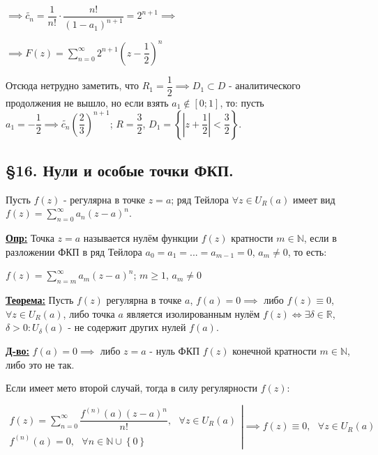 \documentclass[a4paper, 12pt]{article}
\begin{document}
 \begin{center}
   $\implies \tilde{c_n} = \dfrac{1}{n!} \cdot \dfrac{n!}{(1 - a_1)^{n+1}} = 2^{n+1} \implies$

   $\implies F(z) = \displaystyle\sum\limits_{n=0}^{\infty} 2^{n+1} \left( z - \dfrac{1}{2} \right)^n$
 \end{center}

 \quad Отсюда нетрудно заметить, что $R_1 = \dfrac{1}{2} \implies D_1 \subset D$ - аналитического продолжения не вышло, но если взять $a_1 \notin [0; 1]$, то: пусть $a_1 = -\dfrac{1}{2} \implies \tilde{c_n} \left( \dfrac{2}{3} \right)^{n+1}$; $R = \dfrac{3}{2}$, $D_1 = \left\{ \left|z+\dfrac{1}{2}\right| < \dfrac{3}{2} \right\}$. 
 
 \begin{center}
    \subsection*{\S16. Нули и особые точки ФКП.}
 \end{center}

 \quad Пусть $f(z)$ - регулярна в точке $z = a$; ряд Тейлора $\forall z \in U_{R} (a)$ имеет вид $f(z) = \displaystyle\sum\limits_{n=0}^{\infty} a_n (z-a)^n$.

 \quad \textbf{\underline{Опр:}} Точка $z = a$ называется нулём функции $f(z)$ кратности \newline $m \in \mathbb{N}$, если в разложении ФКП в ряд Тейлора $a_0 = a_1 = ... = a_{m-1} = 0$, $a_m \neq 0$, то есть:

 \begin{center}
   $f(z) = \displaystyle\sum\limits_{n=m}^{\infty} a_m (z-a)^n$; $m \geq 1$, $a_m \neq 0$
 \end{center}

 \quad \textbf{\underline{Теорема:}} Пусть $f(z)$ регулярна в точке $a$, $f(a) = 0 \implies $ либо $f(z) \equiv 0$, $\forall z \in U_R (a)$, либо точка $a$ является изолированным нулём $f(z) \Leftrightarrow \exists \delta \in \mathbb{R}$, $\delta > 0 : U_{\delta} (a)$ - не содержит других нулей $f(a)$.

 \quad \textbf{\underline{Д-во:}} $f(a) = 0 \implies $ либо $z = a$ - нуль ФКП $f(z)$ конечной кратности $m \in \mathbb{N}$, либо это не так. 

 \quad Если имеет мето второй случай, тогда в силу регулярности $f(z)$:

 \begin{center}
   $\left. 
   \begin{array}{c}
     f(z) = \displaystyle\sum\limits_{n=0}^{\infty} \dfrac{f^{(n)} (a) (z-a)^n}{n!}, \text{ } \forall z \in U_R (a) \\
     f^{(n)} (a) = 0, \text{ } \forall n \in \mathbb{N} \cup \left\{ 0 \right\}
   \end{array}
   \right| \implies f(z) \equiv 0, \text{ } \forall z \in U_R (a)$
 \end{center}
\end{document}
